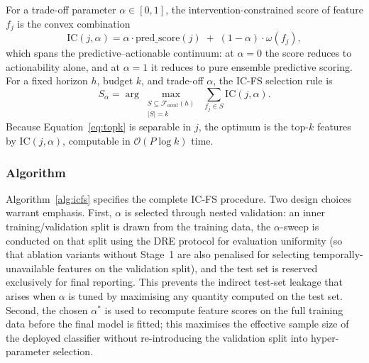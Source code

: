 \documentclass[a4paper,fleqn]{cas-sc}
\begin{document}
For a trade-off parameter $\alpha \in [0, 1]$, the
intervention-constrained score of feature $f_j$ is the convex combination
\begin{equation}
    \mathrm{IC}(j, \alpha)
    = \alpha \cdot \mathrm{pred\_score}(j)
    \;+\; (1 - \alpha) \cdot \omega(f_j),
    \label{eq:ic_score}
\end{equation}
which spans the predictive--actionable continuum: at $\alpha = 0$ the score reduces to actionability alone, and at $\alpha = 1$ it reduces to pure ensemble predictive scoring. For a fixed horizon $h$, budget $k$, and trade-off $\alpha$, the IC-FS selection rule is
\begin{equation}
    S_\alpha
    = \arg\max_{\substack{S \subseteq \mathcal{F}_{avail}(h) \\ |S| = k}}
        \;\sum_{f_j \in S} \mathrm{IC}(j, \alpha).
    \label{eq:topk}
\end{equation}
Because Equation~\eqref{eq:topk} is separable in $j$, the optimum is the top-$k$ features by $\mathrm{IC}(j, \alpha)$, computable in $\mathcal{O}(P \log k)$ time.

\subsubsection{Algorithm}
\label{sec:icfs:algo_spec}

Algorithm~\ref{alg:icfs} specifies the complete IC-FS procedure. Two design choices warrant emphasis. First, $\alpha$ is selected through nested validation: an inner training/validation split is drawn from the training data, the $\alpha$-sweep is conducted on that split using the DRE protocol for evaluation uniformity (so that ablation variants without Stage~1 are also penalised for selecting temporally-unavailable features on the validation split), and the test set is reserved exclusively for final reporting. This prevents the indirect test-set leakage that arises when $\alpha$ is tuned by maximising any quantity computed on the test set. Second, the chosen $\alpha^*$ is used to recompute feature scores on the full training data before the final model is fitted; this maximises the effective sample size of the deployed classifier without re-introducing the validation split into hyper-parameter selection.
\end{document}
